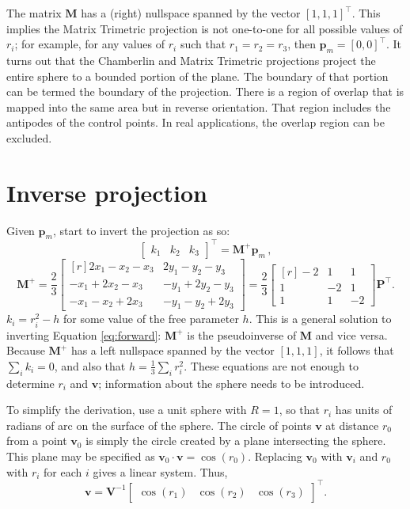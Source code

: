 \documentclass[]{interact}
\begin{document}
The matrix $\mathbf M$ has a (right) nullspace spanned by the vector
$[1, 1, 1]^\top$. This implies the Matrix Trimetric projection is not one-to-one for
all possible values of $r_i$; for example, for any values of $r_i$ such that
$r_1 = r_2 = r_3$, then $\mathbf p_m = [0, 0]^\top$. It turns out that the
Chamberlin and Matrix Trimetric projections project the entire sphere to a
bounded portion of the plane. The boundary of that portion can be termed the
boundary of the projection. There is a region of overlap that is mapped into
the same area but in reverse orientation. That region includes the antipodes of
the control points. In real applications, the overlap region can be excluded.

\section{Inverse projection}
Given $\mathbf p_m$, start to invert the projection as so:
\begin{equation}\label{eq:inverse}
\begin{bmatrix*} k_1 & k_2 & k_3
\end{bmatrix*}^\top = \mathbf M^+ \mathbf p_m \,,
\end{equation}
\begin{equation}\label{eq:inversem}
\mathbf M^+ = \frac{2}{3}
\begin{bmatrix*}[r] 2x_1 - x_2 - x_3 & 2y_1 - y_2 - y_3 \\
-x_1 + 2x_2 - x_3 & -y_1 + 2y_2 - y_3 \\
-x_1 - x_2 + 2x_3 & -y_1 - y_2 + 2y_3
\end{bmatrix*} = \frac{2}{3}
\begin{bmatrix*}[r] -2 & 1 & 1 \\
1 & -2 & 1 \\
1 & 1 & -2
\end{bmatrix*}
\mathbf P^\top .
\end{equation}
$k_i = r^2_i - h$ for some value of the free parameter $h$. This is a general
solution to inverting Equation \ref{eq:forward}: $\mathbf M^+$ is the
pseudoinverse of $\mathbf M$ and vice versa. Because $\mathbf M^+$ has a left
nullspace spanned by the vector $[1, 1, 1]$, it follows that $\sum_i k_i = 0$,
and also that $h = \frac{1}{3}\sum_i r^2_i$.
These equations are not enough to determine $r_i$ and $\mathbf v$;
information about the sphere needs to be introduced.

To simplify the derivation, use a unit sphere with $R=1$, so that $r_i$ has
units of radians of arc on the surface of the sphere. The circle of points
$\mathbf v$ at distance $r_0$ from a point $\mathbf v_0$ is simply the circle
created by a plane intersecting the sphere. This plane may be specified as
$\mathbf v_0 \cdot \mathbf v = \cos\left(r_0\right).$
Replacing $\mathbf v_0$ with $\mathbf v_i$ and $r_0$ with $r_i$
for each $i$ gives a linear system. Thus,
\begin{equation}\label{eq:inversev}
  \mathbf v = \mathbf V^{-1} \begin{bmatrix*} \cos\left(r_1\right) &
  \cos\left(r_2\right) &
  \cos\left(r_3\right)
  \end{bmatrix*}^\top .
\end{equation}
\end{document}
